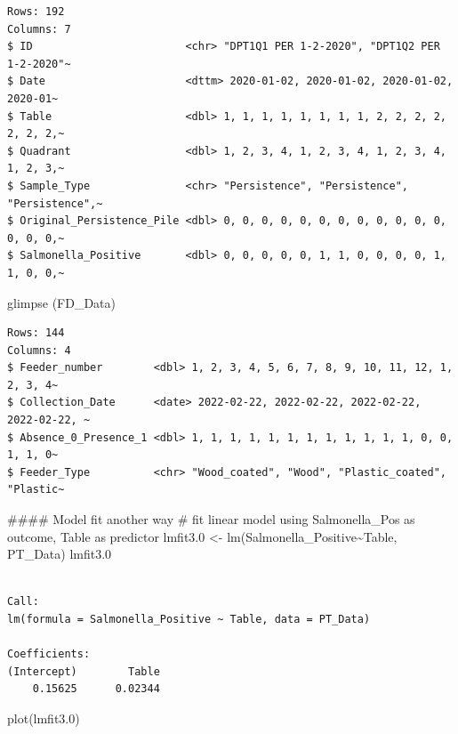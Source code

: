 \documentclass[
  letterpaper,
  DIV=11,
  numbers=noendperiod]{scrartcl}
\newenvironment{Shaded}{}{}
\newcommand{\CommentTok}[1]{\textcolor[rgb]{0.42,0.45,0.49}{#1}}
\newcommand{\DocumentationTok}[1]{\textcolor[rgb]{0.42,0.45,0.49}{#1}}
\newcommand{\FloatTok}[1]{\textcolor[rgb]{0.00,0.36,0.77}{#1}}
\newcommand{\FunctionTok}[1]{\textcolor[rgb]{0.44,0.26,0.76}{#1}}
\newcommand{\NormalTok}[1]{\textcolor[rgb]{0.14,0.16,0.18}{#1}}
\newcommand{\OtherTok}[1]{\textcolor[rgb]{0.44,0.26,0.76}{#1}}
\newcommand{\SpecialCharTok}[1]{\textcolor[rgb]{0.00,0.36,0.77}{#1}}
\begin{document}
\begin{verbatim}
Rows: 192
Columns: 7
$ ID                        <chr> "DPT1Q1 PER 1-2-2020", "DPT1Q2 PER 1-2-2020"~
$ Date                      <dttm> 2020-01-02, 2020-01-02, 2020-01-02, 2020-01~
$ Table                     <dbl> 1, 1, 1, 1, 1, 1, 1, 1, 2, 2, 2, 2, 2, 2, 2,~
$ Quadrant                  <dbl> 1, 2, 3, 4, 1, 2, 3, 4, 1, 2, 3, 4, 1, 2, 3,~
$ Sample_Type               <chr> "Persistence", "Persistence", "Persistence",~
$ Original_Persistence_Pile <dbl> 0, 0, 0, 0, 0, 0, 0, 0, 0, 0, 0, 0, 0, 0, 0,~
$ Salmonella_Positive       <dbl> 0, 0, 0, 0, 0, 1, 1, 0, 0, 0, 0, 1, 1, 0, 0,~
\end{verbatim}

\begin{Shaded}
\begin{Highlighting}[]
\FunctionTok{glimpse}\NormalTok{ (FD\_Data)}
\end{Highlighting}
\end{Shaded}

\begin{verbatim}
Rows: 144
Columns: 4
$ Feeder_number        <dbl> 1, 2, 3, 4, 5, 6, 7, 8, 9, 10, 11, 12, 1, 2, 3, 4~
$ Collection_Date      <date> 2022-02-22, 2022-02-22, 2022-02-22, 2022-02-22, ~
$ Absence_0_Presence_1 <dbl> 1, 1, 1, 1, 1, 1, 1, 1, 1, 1, 1, 1, 0, 0, 1, 1, 0~
$ Feeder_Type          <chr> "Wood_coated", "Wood", "Plastic_coated", "Plastic~
\end{verbatim}

\begin{Shaded}
\begin{Highlighting}[]
\DocumentationTok{\#\#\#\# Model fit another way}
\CommentTok{\# fit linear model using Salmonella\_Pos as outcome, Table as predictor}
\NormalTok{lmfit3}\FloatTok{.0} \OtherTok{\textless{}{-}} \FunctionTok{lm}\NormalTok{(Salmonella\_Positive}\SpecialCharTok{\textasciitilde{}}\NormalTok{Table, PT\_Data) }
\NormalTok{lmfit3}\FloatTok{.0}
\end{Highlighting}
\end{Shaded}

\begin{verbatim}

Call:
lm(formula = Salmonella_Positive ~ Table, data = PT_Data)

Coefficients:
(Intercept)        Table  
    0.15625      0.02344  
\end{verbatim}

\begin{Shaded}
\begin{Highlighting}[]
\FunctionTok{plot}\NormalTok{(lmfit3}\FloatTok{.0}\NormalTok{)}
\end{Highlighting}
\end{Shaded}
\end{document}
